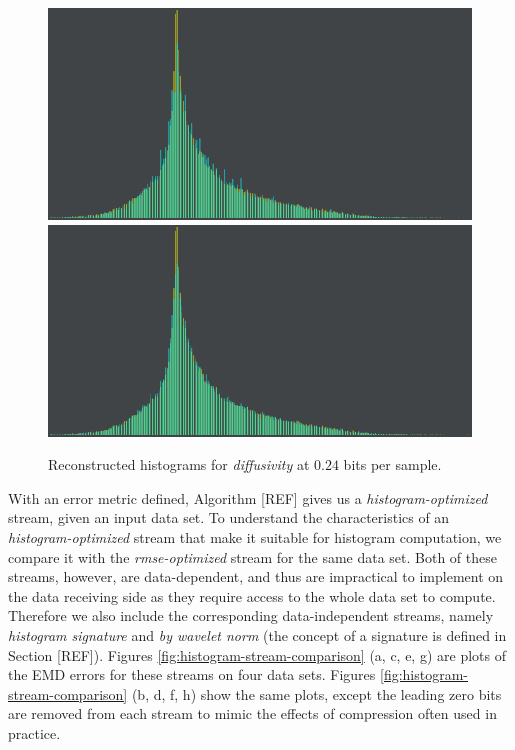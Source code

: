 \begin{figure}
	{\includegraphics[width=0.24\linewidth]{img/histogram/different-metrics/kolmogorov_smirnov.png}}
	{\includegraphics[width=0.24\linewidth]{img/histogram/different-metrics/kullback_liebler.png}}
	\caption{Reconstructed histograms for \emph{diffusivity} at $0.24$ bits per sample.}
	\label{fig:histogram-metrics-comparison2}
\end{figure}

With an error metric defined, Algorithm [REF] gives us a \emph{histogram-optimized} stream, given an
input data set. To understand the characteristics of an \emph{histogram-optimized} stream that make
it suitable for histogram computation, we compare it with the \emph{rmse-optimized} stream for the
same data set. Both of these streams, however, are data-dependent, and thus are impractical to
implement on the data receiving side as they require access to the whole data set to compute.
Therefore we also include the corresponding data-independent streams, namely \emph{histogram
signature} and \emph{by wavelet norm} (the concept of a signature is defined in Section [REF]).
Figures \ref{fig:histogram-stream-comparison} (a, c, e, g) are plots of the EMD errors for these
streams on four data sets. Figures \ref{fig:histogram-stream-comparison} (b, d, f, h) show the same
plots, except the leading zero bits are removed from each stream to mimic the effects of
compression often used in practice.

